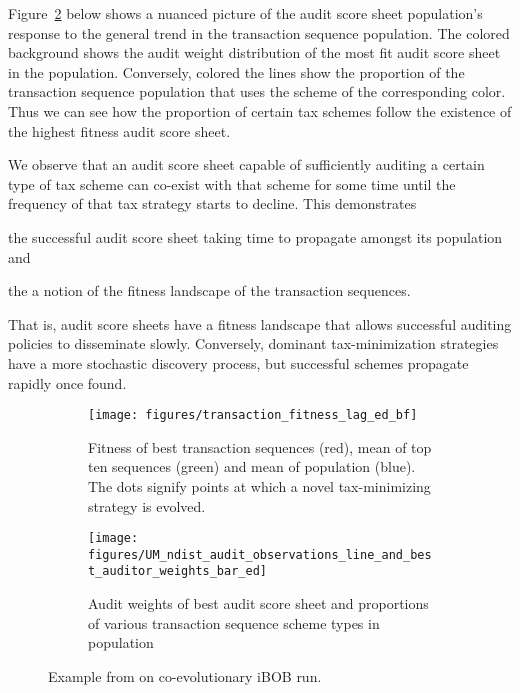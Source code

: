 Figure~\ref{fig:best_audit_weights} below shows a nuanced picture of
the audit score sheet population's response to the general trend in
the transaction sequence population. The colored background shows the
audit weight distribution of the most fit audit score sheet in
the population. Conversely, colored the lines show the proportion of
the transaction sequence population that uses the scheme of the
corresponding color. Thus we can see how the proportion of certain tax
schemes follow the existence of the highest fitness audit score sheet.

We observe that an audit score sheet capable of sufficiently auditing
a certain type of tax scheme can co-exist with that scheme for some
time until the frequency of that tax strategy starts to decline. This
demonstrates
\begin{inparaenum}[\itshape a)]
	\item the successful audit score sheet taking time to
          propagate amongst its population and
	\item the a notion of the fitness landscape of the transaction
          sequences.
\end{inparaenum}
That is, audit score sheets have a fitness landscape that allows
successful auditing policies to disseminate slowly. Conversely,
dominant tax-minimization strategies have a more stochastic discovery
process, but successful schemes propagate rapidly once found.

\begin{figure}[!htb]
\centering
\begin{subfigure}{.49\textwidth}
\texttt{[image: figures/transaction\_fitness\_lag\_ed\_bf]}
\caption{{\small Fitness of best transaction sequences (red), mean of
    top ten sequences (green) and mean of population (blue). The dots
    signify points at which a novel tax-minimizing strategy is
    evolved.}}
\label{fig:transaction_lag}
\end{subfigure}
\begin{subfigure}{.49\textwidth}
\centering
\texttt{[image: figures/UM\_ndist\_audit\_observations\_line\_and\_best\_auditor\_weights\_bar\_ed]}
\caption{{\small Audit weights of best audit score sheet and
    proportions of various transaction sequence scheme types in
    population}}
\label{fig:best_audit_weights}
\end{subfigure}
\caption{{\small Example from on co-evolutionary iBOB run.}}
\label{fig:best_solution_example}
\end{figure}

